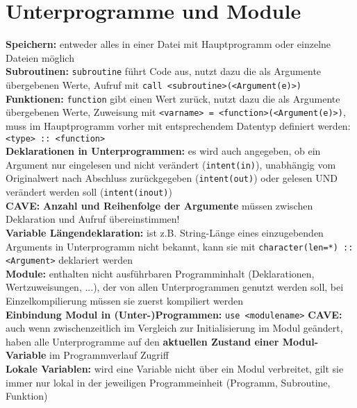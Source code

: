 \documentclass[a4paper, twocolumn]{scrarticle}
\begin{document}
  \section{Unterprogramme und Module}
  \textbf{Speichern:} entweder alles in einer Datei mit Hauptprogramm oder einzelne Dateien möglich\\
  \textbf{Subroutinen:} \lstinline|subroutine| führt Code aus, nutzt dazu die als Argumente übergebenen Werte, Aufruf mit \lstinline|call <subroutine>(<Argument(e)>)|\\
  \textbf{Funktionen:} \lstinline|function| gibt einen Wert zurück, nutzt dazu die als Argumente übergebenen Werte, Zuweisung mit \lstinline|<varname> = <function>(<Argument(e)>)|, muss im Hauptprogramm vorher mit entsprechendem Datentyp definiert werden: \lstinline|<type> :: <function>|\\
  \textbf{Deklarationen in Unterprogrammen:}  es wird auch angegeben, ob ein Argument nur eingelesen und nicht verändert (\lstinline|intent(in)|), unabhängig vom Originalwert nach Abschluss zurückgegeben (\lstinline|intent(out)|) oder gelesen UND verändert werden soll (\lstinline|intent(inout)|)\\
  \textbf{CAVE:} \textbf{Anzahl und Reihenfolge der Argumente} müssen zwischen Deklaration und Aufruf übereinstimmen!\\
  \textbf{Variable Längendeklaration:} ist z.B. String-Länge  eines einzugebenden Arguments in Unterprogramm nicht bekannt, kann sie mit \lstinline|character(len=*) :: <Argument>| deklariert werden\\
  \textbf{Module:} enthalten nicht ausführbaren  Programminhalt (Deklarationen, Wertzuweisungen, ...), der von allen Unterprogrammen genutzt werden soll, bei Einzelkompilierung müssen sie zuerst kompiliert werden\\
  \textbf{Einbindung Modul in (Unter-)Programmen:} \lstinline|use <modulename>|
  \textbf{CAVE:} auch wenn zwischenzeitlich im Vergleich zur Initialisierung im Modul geändert, haben alle Unterprogramme auf den \textbf{aktuellen Zustand einer Modul-Variable} im Programmverlauf Zugriff\\
  \textbf{Lokale Variablen:} wird eine Variable nicht über ein Modul \glqq verbreitet\grqq, gilt sie immer nur lokal in der jeweiligen Programmeinheit (Programm, Subroutine, Funktion)
\end{document}

